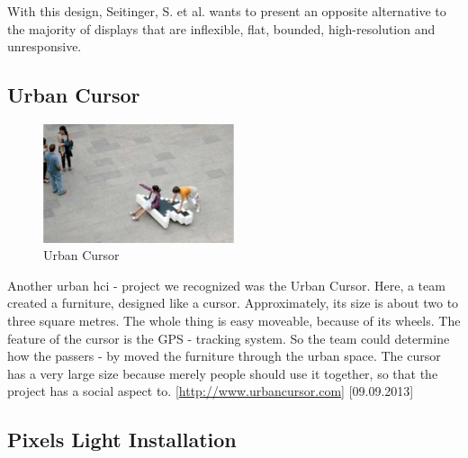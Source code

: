 With this design, Seitinger, S. et al. \cite{seitinger-2} wants to present an opposite alternative to the majority of displays that are inflexible, flat, bounded, high-resolution and unresponsive. 


\subsection{Urban Cursor}

\begin{figure}[h!]
	\centering
	\includegraphics[width=0.5\textwidth, clip=true, keepaspectratio=true]{./pic/urban_cursor.png}
	\caption{Urban Cursor}
	\label{fig:urban_cursor}
\end{figure}

Another urban hci - project we recognized was the Urban Cursor.\newline 
Here, a team created a furniture, designed like a cursor. Approximately, its size is about two to three square metres. The whole thing is easy moveable, because of its wheels. The feature of the cursor is the GPS - tracking system. So the team could determine how the passers - by moved the furniture through the urban space.\newline
The cursor has a very large size because merely people should use it together, so that the project has a social aspect to.
[{\url{http://www.urbancursor.com}}] [09.09.2013] 

\subsection{Pixels Light Installation}


